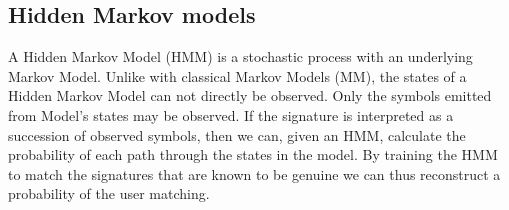 \documentclass[a4paper, oneside]{csthesis}
\begin{document}







\subsection{Hidden Markov models}


A Hidden Markov Model (HMM) is a stochastic process with an underlying Markov Model.
Unlike with classical Markov Models (MM), the states of a Hidden Markov Model can not directly be observed. Only the symbols emitted from Model's states may be observed. If the signature is interpreted as a succession of observed symbols, then we can, given an HMM, calculate the probability of each path through the states in the model. By training the HMM to match the signatures that are known to be genuine we can thus reconstruct a probability of the user matching.
\end{document}
